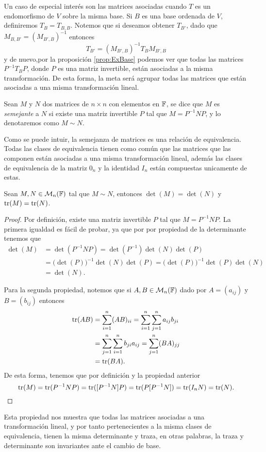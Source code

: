 Un caso de especial interés son las matrices asociadas cuando $T$ es un endomorfismo de $V$ sobre la misma base. Si $B$ es una base ordenada de $V$, definiremos $T_B = T_{B,B}$. Notemos que si deseamos obtener $T_{B'}$, dado que $M_{B,B'} = (M_{B',B})^{-1}$ entonces 
  \[ T_{B'} = (M_{B',B})^{-1} T_B M_{B',B} \]
y de nuevo,por la proposición \ref{prop:ExBase} podemos ver que todas las matrices $P^{-1}T_{B}P$, donde $P$ es una matriz invertible, están asociadas a la misma transformación. De esta forma, la meta será agrupar todas las matrices que están asociadas a una misma transformación lineal.

\begin{defi}
  Sean $M$ y $N$ dos matrices de $n \times n$ con elementos en $\mathbb{F}$, se dice que $M$ es \emph{semejante} a $N$ si existe una matriz invertible $P$ tal que $M = P^{-1}NP$, y lo denotaremos como $M \sim N$.
\end{defi}

Como se puede intuir, la semejanza de matrices es una relación de equivalencia. Todas las clases de equivalencia tienen como común que las matrices que las componen están asociadas a una misma transformación lineal, además las clases de equivalencia de la matriz $0_n$ y la identidad $I_n$ están compuestas unicamente de estas. 

\begin{prop}
  Sean $M,N \in \mathcal{M}_n(\mathbb{F})$ tal que $M \sim N$, entonces $\det(M) = \det(N)$ y $\operatorname{tr}(M) = \operatorname{tr}(N)$.
\end{prop}
\begin{proof}
  Por definición, existe una matriz invertible $P$ tal que $M = P^{-1}NP$. La primera igualdad es fácil de probar, ya que por por propiedad de la determinante tenemos  que
  \begin{align*}
    \det(M) &= \det(P^{-1}NP) = \det(P^{-1})\det(N) \det(P)  \\
      &= \bigl(\det(P)\bigr)^{-1} \det(N) \det(P) = \bigl(\det(P)\bigr)^{-1}\det(P)\det(N)  \\
      &= \det(N).
  \end{align*}
  
  Para la segunda propiedad, notemos que si $A,B \in \mathcal{M}_n(\mathbb{F})$ dado por $A = (a_{ij})$ y $B = (b_{ij})$ entonces
  \begin{align*}
    \operatorname{tr}(AB) &= \sum_{i=1}^n (AB)_{ii} = \sum_{i=1}^n \sum_{j=1}^n a_{ij} b_{ji} \\
      &=  \sum_{j=1}^n \sum_{i=1}^n b_{ji} a_{ij} = \sum_{j=1}^n (BA)_{jj} \\
      &= \operatorname{tr}(BA).
  \end{align*}
  De esta forma, tenemos que por definición y la propiedad anterior
  \[ \operatorname{tr}(M) = \operatorname{tr}(P^{-1}NP) = \operatorname{tr}([P^{-1}N]P) = \operatorname{tr}(P[P^{-1}N]) = \operatorname{tr}(I_n N) = \operatorname{tr}(N). \]
\end{proof}

Esta propiedad nos muestra que todas las matrices asociadas a una transformación lineal, y por tanto pertenecientes a la misma clases de equivalencia, tienen la misma determinante y traza, en otras palabras, la traza y determinante son invariantes ante el cambio de base.



